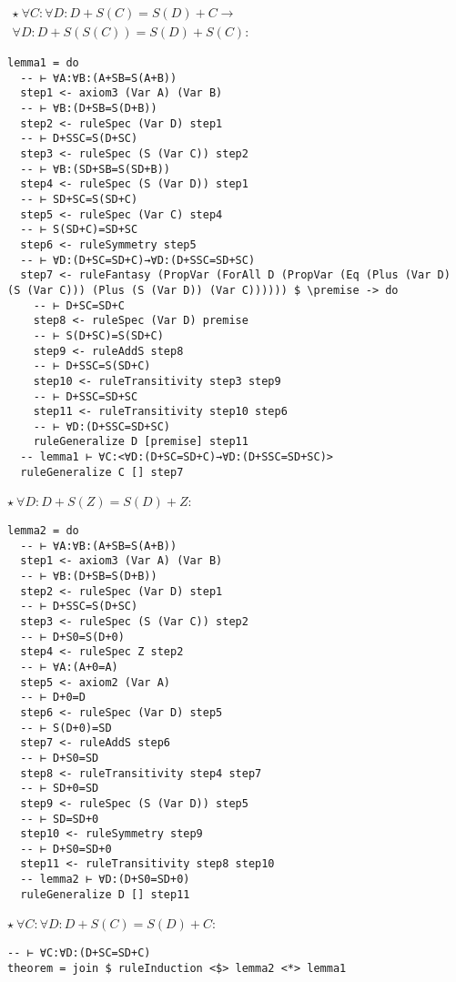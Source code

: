 \documentclass{article}
\begin{document}
\begin{minipage}[t]{0.53\textwidth}
$\begin{aligned}
\star \ \forall C: \forall D: D + S(C) = S(D) + C \to \\
\forall D: D + S(S(C)) = S(D) + S(C):
\end{aligned}$

\begin{lstlisting}
lemma1 = do
  -- ⊢ ∀A:∀B:(A+SB=S(A+B))
  step1 <- axiom3 (Var A) (Var B)
  -- ⊢ ∀B:(D+SB=S(D+B))
  step2 <- ruleSpec (Var D) step1
  -- ⊢ D+SSC=S(D+SC)
  step3 <- ruleSpec (S (Var C)) step2
  -- ⊢ ∀B:(SD+SB=S(SD+B))
  step4 <- ruleSpec (S (Var D)) step1
  -- ⊢ SD+SC=S(SD+C)
  step5 <- ruleSpec (Var C) step4
  -- ⊢ S(SD+C)=SD+SC
  step6 <- ruleSymmetry step5
  -- ⊢ ∀D:(D+SC=SD+C)→∀D:(D+SSC=SD+SC)
  step7 <- ruleFantasy (PropVar (ForAll D (PropVar (Eq (Plus (Var D) (S (Var C))) (Plus (S (Var D)) (Var C)))))) $ \premise -> do
    -- ⊢ D+SC=SD+C
    step8 <- ruleSpec (Var D) premise
    -- ⊢ S(D+SC)=S(SD+C)
    step9 <- ruleAddS step8
    -- ⊢ D+SSC=S(SD+C)
    step10 <- ruleTransitivity step3 step9
    -- ⊢ D+SSC=SD+SC
    step11 <- ruleTransitivity step10 step6
    -- ⊢ ∀D:(D+SSC=SD+SC)
    ruleGeneralize D [premise] step11
  -- lemma1 ⊢ ∀C:<∀D:(D+SC=SD+C)→∀D:(D+SSC=SD+SC)>
  ruleGeneralize C [] step7
\end{lstlisting}
\end{minipage}
\begin{minipage}[t]{0.45\textwidth}
$\star \ \forall D: D + S(Z) = S(D) + Z$:

\begin{lstlisting}
lemma2 = do
  -- ⊢ ∀A:∀B:(A+SB=S(A+B))
  step1 <- axiom3 (Var A) (Var B)
  -- ⊢ ∀B:(D+SB=S(D+B))
  step2 <- ruleSpec (Var D) step1
  -- ⊢ D+SSC=S(D+SC)
  step3 <- ruleSpec (S (Var C)) step2
  -- ⊢ D+S0=S(D+0)
  step4 <- ruleSpec Z step2
  -- ⊢ ∀A:(A+0=A)
  step5 <- axiom2 (Var A)
  -- ⊢ D+0=D
  step6 <- ruleSpec (Var D) step5
  -- ⊢ S(D+0)=SD
  step7 <- ruleAddS step6
  -- ⊢ D+S0=SD
  step8 <- ruleTransitivity step4 step7
  -- ⊢ SD+0=SD
  step9 <- ruleSpec (S (Var D)) step5
  -- ⊢ SD=SD+0
  step10 <- ruleSymmetry step9
  -- ⊢ D+S0=SD+0
  step11 <- ruleTransitivity step8 step10
  -- lemma2 ⊢ ∀D:(D+S0=SD+0)
  ruleGeneralize D [] step11
\end{lstlisting}

$\star \ \forall C: \forall D: D + S(C) = S(D) + C$:

\begin{lstlisting}
-- ⊢ ∀C:∀D:(D+SC=SD+C)
theorem = join $ ruleInduction <$> lemma2 <*> lemma1
\end{lstlisting}
\end{minipage}
\end{document}

